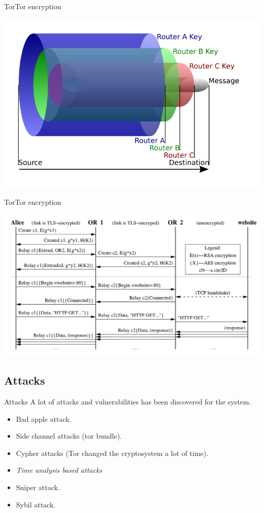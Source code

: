 \begin{frame}{Tor}{Tor encryption}
\begin{center}
	\includegraphics[scale=0.35]{img/onion.png}
\end{center}
\end{frame}

\begin{frame}{Tor}{Tor encryption}
\begin{center}
	\includegraphics[scale=0.28]{img/or-communication.png}
\end{center}
\end{frame}
\subsection{Attacks}
\begin{frame}{Attacks}{}
	A lot of attacks and vulnerabilities has been discovered for the system.
	\begin{itemize}
		\item Bad apple attack.
		\item Side channel attacks (tor bundle).
		\item Cypher attacks (Tor changed the cryptosystem a lot of time).
		\item \emph{Time analysis based attacks}
		\item Sniper attack.
		\item Sybil attack.
	\end{itemize}
\end{frame}

